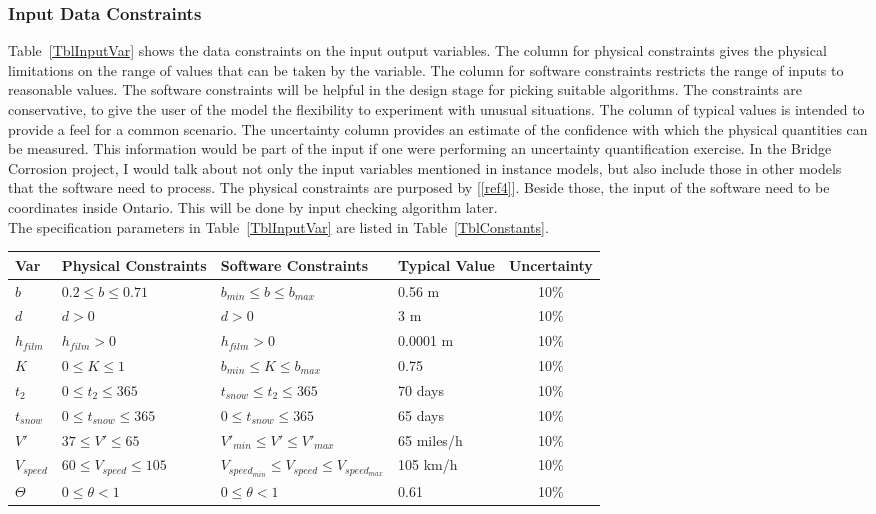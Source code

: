 \documentclass[12pt]{article}
\newcommand{\reref}[1]{\ref{#1}}
\begin{document}
\subsubsection{Input Data Constraints} \label{sec_DataConstraints}    

Table~\ref{TblInputVar} shows the data constraints on the input output
variables.  The column for physical constraints gives the physical limitations
on the range of values that can be taken by the variable.  The column for
software constraints restricts the range of inputs to reasonable values.  The
software constraints will be helpful in the design stage for picking suitable
algorithms.  The constraints are conservative, to give the user of the model the
flexibility to experiment with unusual situations.  The column of typical values
is intended to provide a feel for a common scenario.  The uncertainty column
provides an estimate of the confidence with which the physical quantities can be
measured.  This information would be part of the input if one were performing an
uncertainty quantification exercise. In the Bridge Corrosion project, I would talk about not only the input variables mentioned in instance models, but also include those in other models that the software need to process. The physical constraints are purposed by [\reref{ref4}]. Beside those, the input of the software need to be coordinates inside Ontario. This will be done by input checking algorithm later. \\
The specification parameters in Table~\ref{TblInputVar} are listed in
Table~\ref{TblConstants}.

\begin{table}[!h]
  \caption{Input Variables} \label{TblInputVar}
  \renewcommand{\arraystretch}{1.2}
\noindent \begin{longtable*}{l l l l c} 
  \toprule
  \textbf{Var} & \textbf{Physical Constraints} & \textbf{Software Constraints} &
                             \textbf{Typical Value} & \textbf{Uncertainty}\\
  \midrule 
  $b$ & $0.2 \leq b \leq 0.71$ & $b_{min} \leq b \leq b_{max}$ & 0.56 m & 10\%
  \\
  $d$ & $d > 0$ & $d>0$ & 3 m & 10\%
  \\
  $h_{film}$ & $h_{film} > 0$ & $h_{film} > 0$ & 0.0001 m & 10\% 
  \\
  $K$ & $0 \leq K \leq 1$ & $b_{min} \leq K \leq b_{max}$ & 0.75 & 10\%
  \\
  $t_2$ & $0 \leq t_2 \leq 365$ & $t_{snow} \leq t_2 \leq 365$ &  70 days & 10\%
  \\
  $t_{snow}$ & $0 \leq t_{snow} \leq 365$ & $0 \leq t_{snow} \leq 365$ & 65 days & 10\%
  \\
  $V'$ & $37 \leq V' \leq 65$ & $V'_{min}\leq V' \leq V'_{max}$ & 65 miles/h & 10\%
  \\
  $V_{speed}$ & $60 \leq V_{speed} \leq 105$ & $V_{speed_{min}} \leq V_{speed} \leq V_{speed_{max}}$ & 105 km/h & 10\%
  \\
  $\Theta$ & $0 \leq \theta < 1$ & $0 \leq \theta < 1$ & 0.61 & 10\%
  \\
  \bottomrule
\end{longtable*}
\end{table}
\end{document}
